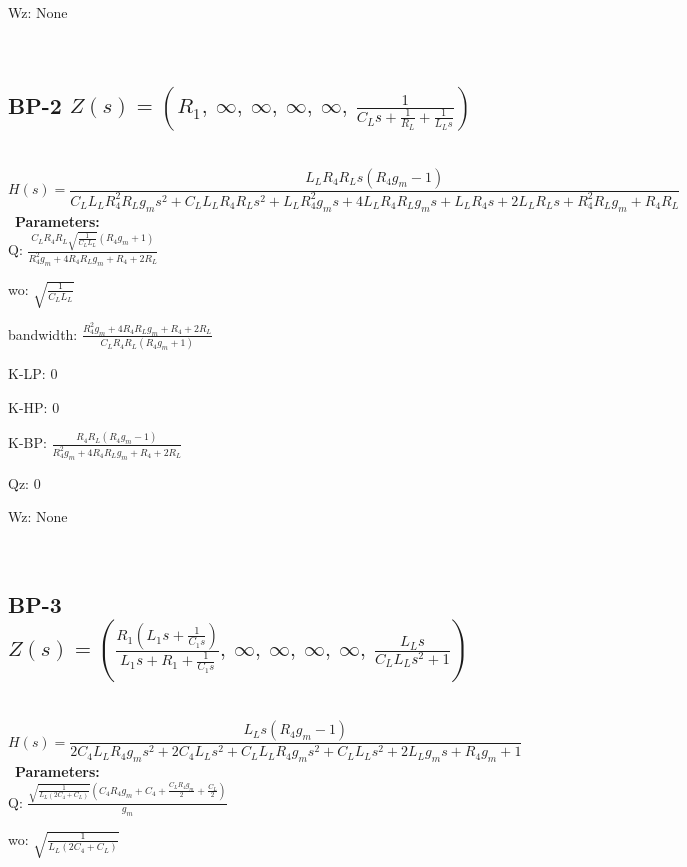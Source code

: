 \documentclass{article}
\begin{document}
Wz: $\text{None}$\ 

\ 

\subsection{BP-2 $Z(s) = \left( R_{1}, \  \infty, \  \infty, \  \infty, \  \infty, \  \frac{1}{C_{L} s + \frac{1}{R_{L}} + \frac{1}{L_{L} s}}\right)$ } \ 
\textbf{\[H(s) = \frac{L_{L} R_{4} R_{L} s \left(R_{4} g_{m} - 1\right)}{C_{L} L_{L} R_{4}^{2} R_{L} g_{m} s^{2} + C_{L} L_{L} R_{4} R_{L} s^{2} + L_{L} R_{4}^{2} g_{m} s + 4 L_{L} R_{4} R_{L} g_{m} s + L_{L} R_{4} s + 2 L_{L} R_{L} s + R_{4}^{2} R_{L} g_{m} + R_{4} R_{L}}\] } \ 
\textbf{Parameters:}\\ 

Q: $\frac{C_{L} R_{4} R_{L} \sqrt{\frac{1}{C_{L} L_{L}}} \left(R_{4} g_{m} + 1\right)}{R_{4}^{2} g_{m} + 4 R_{4} R_{L} g_{m} + R_{4} + 2 R_{L}}$\ 

wo: $\sqrt{\frac{1}{C_{L} L_{L}}}$\ 

bandwidth: $\frac{R_{4}^{2} g_{m} + 4 R_{4} R_{L} g_{m} + R_{4} + 2 R_{L}}{C_{L} R_{4} R_{L} \left(R_{4} g_{m} + 1\right)}$\ 

K-LP: $0$\ 

K-HP: $0$\ 

K-BP: $\frac{R_{4} R_{L} \left(R_{4} g_{m} - 1\right)}{R_{4}^{2} g_{m} + 4 R_{4} R_{L} g_{m} + R_{4} + 2 R_{L}}$\ 

Qz: $0$\ 

Wz: $\text{None}$\ 

\ 

\subsection{BP-3 $Z(s) = \left( \frac{R_{1} \left(L_{1} s + \frac{1}{C_{1} s}\right)}{L_{1} s + R_{1} + \frac{1}{C_{1} s}}, \  \infty, \  \infty, \  \infty, \  \infty, \  \frac{L_{L} s}{C_{L} L_{L} s^{2} + 1}\right)$ } \ 
\textbf{\[H(s) = \frac{L_{L} s \left(R_{4} g_{m} - 1\right)}{2 C_{4} L_{L} R_{4} g_{m} s^{2} + 2 C_{4} L_{L} s^{2} + C_{L} L_{L} R_{4} g_{m} s^{2} + C_{L} L_{L} s^{2} + 2 L_{L} g_{m} s + R_{4} g_{m} + 1}\] } \ 
\textbf{Parameters:}\\ 

Q: $\frac{\sqrt{\frac{1}{L_{L} \left(2 C_{4} + C_{L}\right)}} \left(C_{4} R_{4} g_{m} + C_{4} + \frac{C_{L} R_{4} g_{m}}{2} + \frac{C_{L}}{2}\right)}{g_{m}}$\ 

wo: $\sqrt{\frac{1}{L_{L} \left(2 C_{4} + C_{L}\right)}}$\ 
\end{document}
